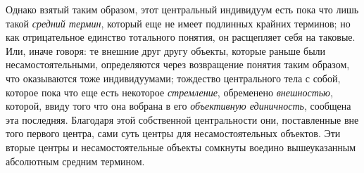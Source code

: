 Однако взятый таким образом, этот центральный индивидуум есть
пока что лишь такой {\em средний
термин}, который еще не имеет подлинных крайних терминов; но
как отрицательное единство тотального понятия, он расщепляет себя на
таковые. Или, иначе говоря: те внешние друг другу объекты, которые раньше
были несамостоятельными, определяются через возвращение понятия таким
образом, что оказываются тоже индивидуумами; тождество центрального тела с
собой, которое пока что еще есть некоторое {\em стремление}, обременено
{\em внешностью}, которой, ввиду того что она вобрана в его
{\em объективную единичность}, сообщена эта последняя.
Благодаря этой собственной
центральности они, поставленные вне того первого центра, сами суть центры
для несамостоятельных объектов. Эти вторые центры и несамостоятельные
объекты сомкнуты воедино вышеуказанным абсолютным средним
термином.


